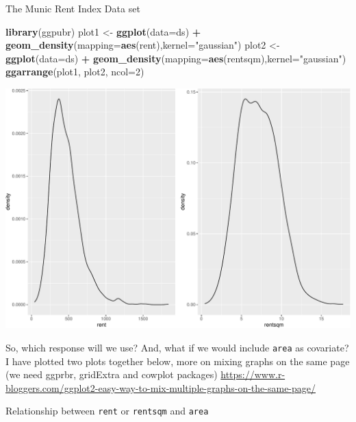 \documentclass[
  ignorenonframetext,
]{beamer}
\newenvironment{Shaded}{\begin{snugshade}}{\end{snugshade}}
\newcommand{\AttributeTok}[1]{\textcolor[rgb]{0.13,0.29,0.53}{#1}}
\newcommand{\DecValTok}[1]{\textcolor[rgb]{0.00,0.00,0.81}{#1}}
\newcommand{\FunctionTok}[1]{\textcolor[rgb]{0.13,0.29,0.53}{\textbf{#1}}}
\newcommand{\NormalTok}[1]{#1}
\newcommand{\OtherTok}[1]{\textcolor[rgb]{0.56,0.35,0.01}{#1}}
\newcommand{\SpecialCharTok}[1]{\textcolor[rgb]{0.81,0.36,0.00}{\textbf{#1}}}
\newcommand{\StringTok}[1]{\textcolor[rgb]{0.31,0.60,0.02}{#1}}
\begin{document}
\begin{frame}[fragile]
\begin{block}{The Munic Rent Index Data set}
\begin{Shaded}
\begin{Highlighting}[]
\FunctionTok{library}\NormalTok{(ggpubr)}
\NormalTok{plot1 }\OtherTok{\textless{}{-}} \FunctionTok{ggplot}\NormalTok{(}\AttributeTok{data=}\NormalTok{ds) }\SpecialCharTok{+}
  \FunctionTok{geom\_density}\NormalTok{(}\AttributeTok{mapping=}\FunctionTok{aes}\NormalTok{(rent),}\AttributeTok{kernel=}\StringTok{"gaussian"}\NormalTok{)}
\NormalTok{plot2 }\OtherTok{\textless{}{-}} \FunctionTok{ggplot}\NormalTok{(}\AttributeTok{data=}\NormalTok{ds) }\SpecialCharTok{+}
  \FunctionTok{geom\_density}\NormalTok{(}\AttributeTok{mapping=}\FunctionTok{aes}\NormalTok{(rentsqm),}\AttributeTok{kernel=}\StringTok{"gaussian"}\NormalTok{)}
\FunctionTok{ggarrange}\NormalTok{(plot1, plot2, }\AttributeTok{ncol=}\DecValTok{2}\NormalTok{)}
\end{Highlighting}
\end{Shaded}

\includegraphics{1Intro_files/figure-beamer/unnamed-chunk-10-1.pdf}

So, which response will we use? And, what if we would include
\texttt{area} as covariate? I have plotted two plots together below,
more on mixing graphs on the same page (we need ggprbr, gridExtra and
cowplot packages)
\url{https://www.r-bloggers.com/ggplot2-easy-way-to-mix-multiple-graphs-on-the-same-page/}

Relationship between \texttt{rent} or \texttt{rentsqm} and \texttt{area}


\end{block}
\end{frame}
\end{document}

